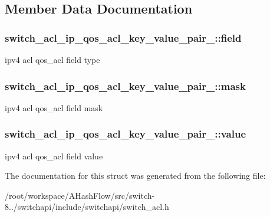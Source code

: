 \subsection{Member Data Documentation}
\hypertarget{structswitch__acl__ip__qos__acl__key__value__pair___a7d463bb49f25798a68d11ae44711c605}{
\subsubsection[{field}]{ switch\+\_\+acl\+\_\+ip\+\_\+qos\+\_\+acl\+\_\+key\+\_\+value\+\_\+pair\+\_\+\+::field}}\label{structswitch__acl__ip__qos__acl__key__value__pair___a7d463bb49f25798a68d11ae44711c605}
ipv4 acl qos\+\_\+acl field type \hypertarget{structswitch__acl__ip__qos__acl__key__value__pair___a1326bbbcd4302d840488872217182588}{
\subsubsection[{mask}]{ switch\+\_\+acl\+\_\+ip\+\_\+qos\+\_\+acl\+\_\+key\+\_\+value\+\_\+pair\+\_\+\+::mask}}\label{structswitch__acl__ip__qos__acl__key__value__pair___a1326bbbcd4302d840488872217182588}
ipv4 acl qos\+\_\+acl field mask \hypertarget{structswitch__acl__ip__qos__acl__key__value__pair___a435da7c1a56035888b54a0547165e643}{
\subsubsection[{value}]{ switch\+\_\+acl\+\_\+ip\+\_\+qos\+\_\+acl\+\_\+key\+\_\+value\+\_\+pair\+\_\+\+::value}}\label{structswitch__acl__ip__qos__acl__key__value__pair___a435da7c1a56035888b54a0547165e643}
ipv4 acl qos\+\_\+acl field value 

The documentation for this struct was generated from the following file\+:\begin{DoxyCompactItemize}
\item 
/root/workspace/\+A\+Hash\+Flow/src/switch-\/8../switchapi/include/switchapi/switch\+\_\+acl.\+h\end{DoxyCompactItemize}
